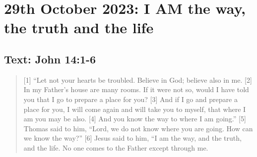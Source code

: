 \setcounter{figure}{0}

\section{29th October 2023: I AM the way, the truth and the life}
\subsection*{Text: John 14:1-6}
  \begin{quote}
    [1] “Let not your hearts be troubled. Believe in God; believe also in me. [2] In my Father’s house are many rooms. If it were not so, would I have told you that I go to prepare a place for you? [3] And if I go and prepare a place for you, I will come again and will take you to myself, that where I am you may be also. [4] And you know the way to where I am going.” [5] Thomas said to him, “Lord, we do not know where you are going. How can we know the way?” [6] Jesus said to him, “I am the way, and the truth, and the life. No one comes to the Father except through me.
  \end{quote}
